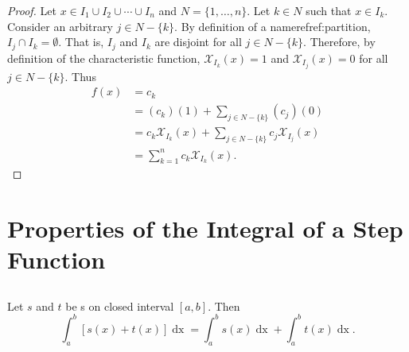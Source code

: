 \documentclass{report}
\begin{document}
\begin{proof}

  Let $x \in I_1 \cup I_2 \cup \cdots \cup I_n$ and $N = \{1, \ldots, n\}$.
  Let $k \in N$ such that $x \in I_k$.
  Consider an arbitrary $j \in N - \{k\}$.
  By definition of a nameref{ref:partition}, $I_j \cap I_k = \emptyset$.
  That is, $I_j$ and $I_k$ are disjoint for all $j \in N - \{k\}$.
  Therefore, by definition of the characteristic function,
    $\mathcal{X}_{I_k}(x) = 1$ and $\mathcal{X}_{I_j}(x) = 0$ for all
    $j \in N - \{k\}$.
  Thus
    \begin{align*}
      f(x)
        & = c_k \\
        & = (c_k)(1) + \sum\nolimits_{j \in N - \{k\}} (c_j)(0) \\
        & = c_k\mathcal{X}_{I_k}(x) +
          \sum\nolimits_{j \in N - \{k\}} c_j\mathcal{X}_{I_j}(x) \\
        & = \sum_{k=1}^n c_k\mathcal{X}_{I_k}(x).
    \end{align*}

\end{proof}

\section{Properties of the Integral of a Step Function}%
\label{sec:properties-integral-step-function}

\subsection{}%
\label{sub:step-additive-property}
\label{sub:theorem-1.2}

\begin{theorem}[1.2]

  Let $s$ and $t$ be s on closed interval
    $[a, b]$.
  Then
    $$\int_a^b \left[ s(x) + t(x) \right] \mathop{dx} =
      \int_a^b s(x) \mathop{dx} + \int_a^b t(x) \mathop{dx}.$$

\end{theorem}
\end{document}
